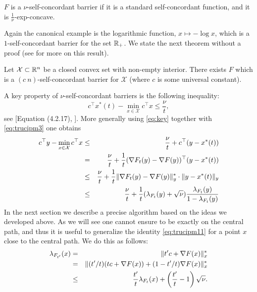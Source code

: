 \begin{definition}
$F$ is a $\nu$-self-concordant barrier if it is a standard self-concordant function, and it is $\frac1{\nu}$-exp-concave.
\end{definition}
Again the canonical example is the logarithmic function, $x \mapsto - \log x$, which is a $1$-self-concordant barrier for the set $\mathbb{R}_{+}$. We state the next theorem without a proof (see \cite{BE14} for more on this result).

\begin{theorem}
Let $\mathcal{X} \subset \mathbb{R}^n$ be a closed convex set with non-empty interior. There exists $F$ which is a $(c \ n)$-self-concordant barrier for $\mathcal{X}$ (where $c$ is some universal constant).
\end{theorem}
A key property of $\nu$-self-concordant barriers is the following inequality:
\begin{equation} \label{eq:key}
c^{\top} x^*(t) - \min_{x \in \mathcal{X}} c^{\top} x \leq \frac{\nu}{t} ,
\end{equation}
see [Equation (4.2.17), \cite{Nes04}]. More generally using \eqref{eq:key} together with \eqref{eq:trucipm3} one obtains
\begin{eqnarray}
c^{\top} y- \min_{x \in \mathcal{X}} c^{\top} x & \leq & \frac{\nu}{t} + c^{\top} (y - x^*(t)) \notag \\
& = & \frac{\nu}{t} + \frac{1}{t} (\nabla F_t(y) - \nabla F(y))^{\top} (y - x^*(t)) \notag \\ 
& \leq & \frac{\nu}{t} + \frac{1}{t} \|\nabla F_t(y) - \nabla F(y)\|_y^* \cdot \|y - x^*(t)\|_y \notag \\
& \leq & \frac{\nu}{t} + \frac{1}{t} (\lambda_{F_t}(y) + \sqrt{\nu})\frac{\lambda_{F_t} (y)}{1 - \lambda_{F_t}(y)} \label{eq:trucipm4}
\end{eqnarray}
In the next section we describe a precise algorithm based on the ideas we developed above. As we will see one cannot ensure to be exactly on the central path, and thus it is useful to generalize the identity \eqref{eq:trucipm11} for a point $x$ close to the central path. We do this as follows:
\begin{eqnarray}
\lambda_{F_{t'}}(x) & = & \|t' c + \nabla F(x)\|_x^* \notag \\
& = &  \|(t' / t) (t c + \nabla F(x)) + (1- t'/t) \nabla F(x)\|_x^* \notag \\
& \leq & \frac{t'}{t} \lambda_{F_t}(x) + \left(\frac{t'}{t} - 1\right) \sqrt{\nu} .\label{eq:trucipm12}
\end{eqnarray}

